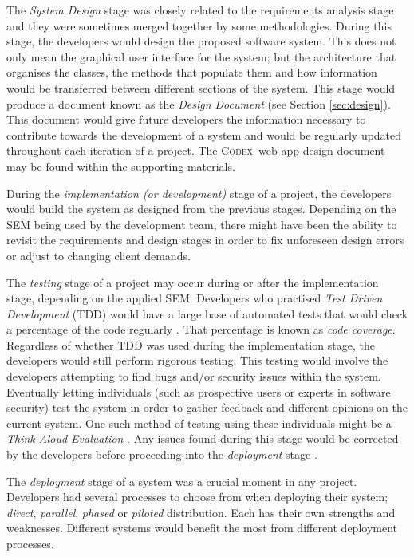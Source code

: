 \documentclass[final]{cmpreport}
\newcommand{\Codex}{\textsc{Codex}}
\begin{document}
			The \emph{System Design} stage was closely related to the requirements analysis stage and they were sometimes merged together by some methodologies. During this stage, the developers would design the proposed software system. This does not only mean the graphical user interface for the system; but the architecture that organises the classes, the methods that populate them and how information would be transferred between different sections of the system. This stage would produce a document known as the \emph{Design Document} (see Section \ref{sec:design}). This document would give future developers the information necessary to contribute towards the development of a system and would be regularly updated throughout each iteration of a project. The \Codex \ web app design document may be found within the supporting materials.
			
			During the \emph{implementation (or development)} stage of a project, the developers would build the system as designed from the previous stages. Depending on the SEM being used by the development team, there might have been the ability to revisit the requirements and design stages in order to fix unforeseen design errors or adjust to changing client demands. 
			
			The \emph{testing} stage of a project may occur during or after the implementation stage, depending on the applied SEM. Developers who practised \emph{Test Driven Development} (TDD) would have a large base of automated tests that would check a percentage of the code regularly \citep{TDD}. That percentage is known as \emph{code coverage}. Regardless of whether TDD was used during the implementation stage, the developers would still perform rigorous testing. This testing would involve the developers attempting to find bugs and/or security issues within the system. Eventually letting individuals (such as prospective users or experts in software security) test the system in order to gather feedback and different opinions on the current system. One such method of testing using these individuals might be a \emph{Think-Aloud Evaluation} \citep{thinkaloud}. Any issues found during this stage would be corrected by the developers before proceeding into the \textit{deployment} stage \citep{testing}.
			
			The \emph{deployment} stage of a system was a crucial moment in any project. Developers had several processes to choose from when deploying their system; \textit{direct}, \textit{parallel}, \textit{phased} or \textit{piloted} distribution. Each has their own strengths and weaknesses. Different systems would benefit the most from different deployment processes. 
			
\end{document}
